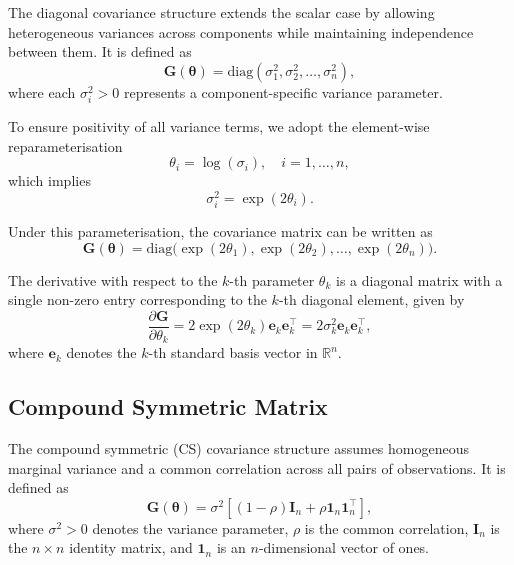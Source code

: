 \documentclass[
  letterpaper,
  DIV=11,
  numbers=noendperiod]{scrartcl}
\begin{document}
The diagonal covariance structure extends the scalar case by allowing
heterogeneous variances across components while maintaining independence
between them. It is defined as \begin{equation}
\symbf{G}(\symbf{\theta}) = \mathrm{diag}(\sigma_1^2, \sigma_2^2, \ldots, \sigma_n^2),
\end{equation} where each \(\sigma_i^2 > 0\) represents a
component-specific variance parameter.

To ensure positivity of all variance terms, we adopt the element-wise
reparameterisation \begin{equation}
\theta_i = \log(\sigma_i), \quad i = 1, \ldots, n,
\end{equation} which implies \begin{equation}
\sigma_i^2 = \exp(2\theta_i).
\end{equation}

Under this parameterisation, the covariance matrix can be written as
\begin{equation}
\symbf{G}(\symbf{\theta}) = \mathrm{diag}\big(\exp(2\theta_1), \exp(2\theta_2), \ldots, \exp(2\theta_n)\big).
\end{equation}

The derivative with respect to the \(k\)-th parameter \(\theta_k\) is a
diagonal matrix with a single non-zero entry corresponding to the
\(k\)-th diagonal element, given by \begin{equation}
\frac{\partial \symbf{G}}{\partial \theta_k}
= 2\exp(2\theta_k) \mathbf{e}_k \mathbf{e}_k^\top
= 2\sigma_k^2 \mathbf{e}_k \mathbf{e}_k^\top,
\end{equation} where \(\mathbf{e}_k\) denotes the \(k\)-th standard
basis vector in \(\mathbb{R}^n\).

\subsection{Compound Symmetric Matrix}\label{compound-symmetric-matrix}

The compound symmetric (CS) covariance structure assumes homogeneous
marginal variance and a common correlation across all pairs of
observations. It is defined as \begin{equation}
\symbf{G}(\symbf{\theta}) = \sigma^2 \left[(1 - \rho)\symbf{I}_n + \rho \mathbf{1}_n \mathbf{1}_n^\top \right],
\end{equation} where \(\sigma^2 > 0\) denotes the variance parameter,
\(\rho\) is the common correlation, \(\symbf{I}_n\) is the
\(n \times n\) identity matrix, and \(\mathbf{1}_n\) is an
\(n\)-dimensional vector of ones.
\end{document}
